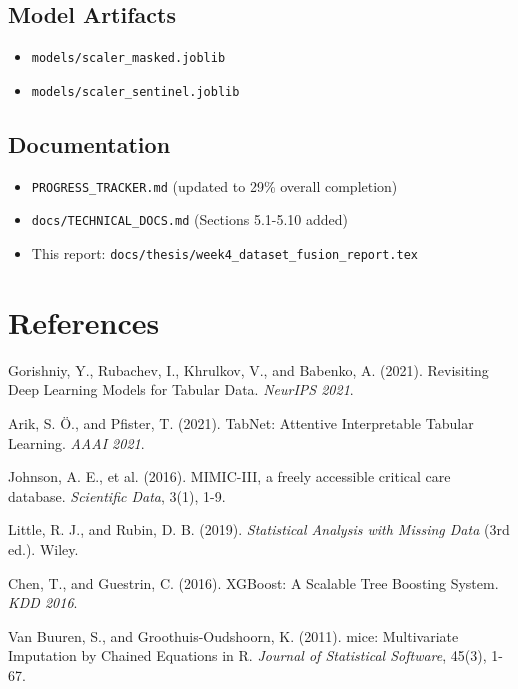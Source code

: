 \documentclass[12pt,a4paper]{article}
\begin{document}
\subsection{Model Artifacts}
\begin{itemize}
    \item \texttt{models/scaler\_masked.joblib}
    \item \texttt{models/scaler\_sentinel.joblib}
\end{itemize}

\subsection{Documentation}
\begin{itemize}
    \item \texttt{PROGRESS\_TRACKER.md} (updated to 29\% overall completion)
    \item \texttt{docs/TECHNICAL\_DOCS.md} (Sections 5.1-5.10 added)
    \item This report: \texttt{docs/thesis/week4\_dataset\_fusion\_report.tex}
\end{itemize}

\section*{References}

\begin{enumerate}[label={[\arabic*]}]
    \item Gorishniy, Y., Rubachev, I., Khrulkov, V., and Babenko, A. (2021). Revisiting Deep Learning Models for Tabular Data. \textit{NeurIPS 2021}.
    
    \item Arik, S. Ö., and Pfister, T. (2021). TabNet: Attentive Interpretable Tabular Learning. \textit{AAAI 2021}.
    
    \item Johnson, A. E., et al. (2016). MIMIC-III, a freely accessible critical care database. \textit{Scientific Data}, 3(1), 1-9.
    
    \item Little, R. J., and Rubin, D. B. (2019). \textit{Statistical Analysis with Missing Data} (3rd ed.). Wiley.
    
    \item Chen, T., and Guestrin, C. (2016). XGBoost: A Scalable Tree Boosting System. \textit{KDD 2016}.
    
    \item Van Buuren, S., and Groothuis-Oudshoorn, K. (2011). mice: Multivariate Imputation by Chained Equations in R. \textit{Journal of Statistical Software}, 45(3), 1-67.
\end{enumerate}
\end{document}
